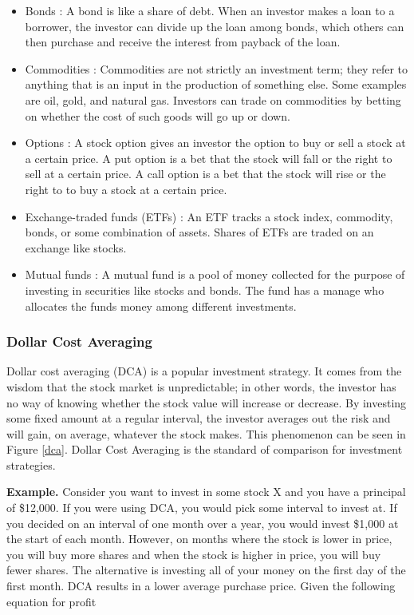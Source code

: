 \documentclass[12pt]{article}
\begin{document}
\begin{itemize}
	\item Bonds : A bond is like a share of debt. When an investor makes a loan to a borrower, the investor can divide up the loan among bonds, which others can then purchase and receive the interest from payback of the loan. 
	\item Commodities : Commodities are not strictly an investment term; they refer to anything that is an input in the production of something else. Some examples are oil, gold, and natural gas. Investors can trade on commodities by betting on whether the cost of such goods will go up or down.
	\item Options : A stock option gives an investor the option to buy or sell a stock at a certain price. A put option is a bet that the stock will fall or the right to sell at a certain price. A call option is a bet that the stock will rise or the right to to buy a stock at a certain price.
	\item Exchange-traded funds (ETFs) : An ETF tracks a stock index, commodity, bonds, or some combination of assets. Shares of ETFs are traded on an exchange like stocks.
	\item Mutual funds : A mutual fund is a pool of money collected for the purpose of investing in securities like stocks and bonds. The fund has a manage who allocates the funds money among different investments. 
\end{itemize}

\subsubsection{Dollar Cost Averaging}
Dollar cost averaging (DCA) is a popular investment strategy. It comes from the wisdom that the stock market is unpredictable; in other words, the investor has no way of knowing whether the stock value will increase or decrease. By investing some fixed amount at a regular interval, the investor averages out the risk and will gain, on average, whatever the stock makes. This phenomenon can be seen in Figure \ref{dca}. Dollar Cost Averaging is the standard of comparison for investment strategies. 

\textbf{Example.} Consider you want to invest in some stock X and you have a principal of \$12,000. If you were using DCA, you would pick some interval to invest at. If you decided on an interval of one month over a year, you would invest \$1,000 at the start of each month. However, on months where the stock is lower in price, you will buy more shares and when the stock is higher in price, you will buy fewer shares. The alternative is investing all of your money on the first day of the first month. DCA results in a lower average purchase price. Given the following equation for profit
\end{document}
